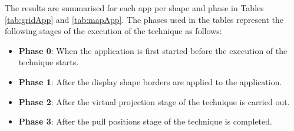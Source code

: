 \documentclass[twocolumn,compsoc]{cvm}
\begin{document}
{%

The results are summarised for each app per shape and phase in Tables \ref{tab:gridApp} and \ref{tab:mapApp}.
The phases used in the tables represent the following stages of the execution of the technique as follows:
\begin{itemize}
  \item \textbf{Phase 0}: 
  When the application is first started before the execution of the technique starts.
  \item \textbf{Phase 1}: 
  After the display shape borders are applied to the application.
  \item \textbf{Phase 2}: 
  After the virtual projection stage of the technique is carried out.
  \item \textbf{Phase 3}: 
  After the pull positions stage of the technique is completed.
\end{itemize}

}
\end{document}
